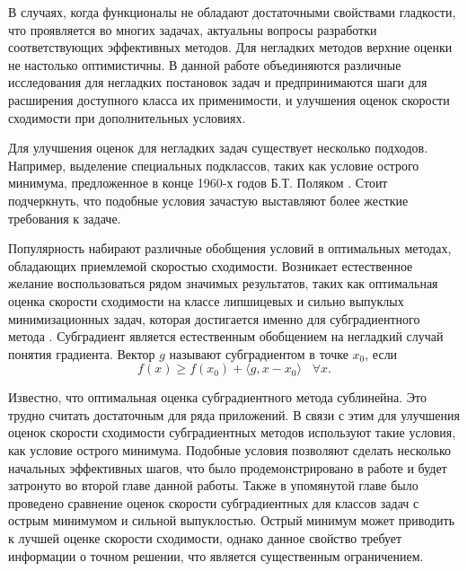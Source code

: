 В случаях, когда функционалы не обладают достаточными свойствами гладкости, что проявляется во многих задачах, актуальны вопросы разработки соответствующих эффективных методов. Для негладких методов верхние оценки не настолько оптимистичны. В данной работе объединяются различные исследования для негладких постановок задач и предпринимаются шаги для расширения доступного класса их применимости, и улучшения оценок скорости сходимости при дополнительных условиях. 

Для улучшения оценок для негладких задач существует несколько подходов. Например, выделение специальных подклассов, таких как условие острого минимума, предложенное в конце 1960-х годов Б.Т. Поляком \cite{Polyak1969}. Стоит подчеркнуть, что подобные условия зачастую выставляют более жесткие требования к задаче. 

Популярность набирают различные обобщения условий в оптимальных методах, обладающих приемлемой скоростью сходимости. Возникает естественное желание воспользоваться рядом значимых результатов, таких как оптимальная оценка скорости сходимости на классе липшицевых и сильно выпуклых минимизационных задач, которая достигается именно для субградиентного метода \cite{Bach_2012}. Субградиент является естественным обобщением на негладкий случай понятия градиента. Вектор $g$ называют субградиентом в точке $x_0$, если
$$
    f(x) \geq f(x_0) + \langle g, x - x_0 \rangle \;\;\; \forall x.
$$

Известно, что оптимальная оценка субградиентного метода сублинейна. Это трудно считать достаточным для ряда приложений. В связи с этим для улучшения оценок скорости сходимости субградиентных методов используют такие условия, как условие острого минимума. Подобные условия позволяют сделать несколько начальных эффективных шагов, что было продемонстрировано в работе \cite{sharp22} и будет затронуто во второй главе данной работы. Также в упомянутой главе было проведено сравнение оценок скорости субградиентных для классов задач с острым минимумом и сильной выпуклостью. Острый минимум может приводить к лучшей оценке скорости сходимости, однако данное свойство требует информации о точном решении, что является существенным ограничением.
\iffalse
    Оценки, получаемые при помощи условия острого минимума, обладают лучшими свойствами сходимости, однако в отсутствии знаний о точном решении нет возможности повысить точность выше предварительно заданной точности, известной для приближенного решения. Оценки скорости сходимости, использующие сильную выпуклость, не обладают столь впечатляющими оценками скорости сходимости, однако позволяют добиться гораздо большей точности. 
\fi


